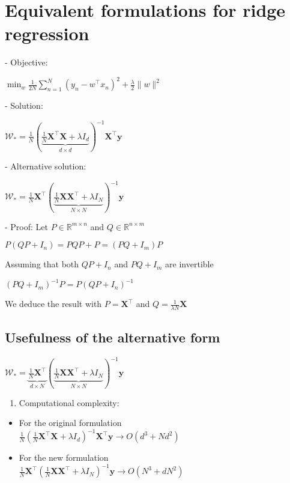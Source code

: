 \section*{Equivalent formulations for ridge regression}
- Objective: 

$
\min _{w} \frac{1}{2 N} \sum_{n=1}^{N}\left(y_{n}-w^{\top} x_{n}\right)^{2}+\frac{\lambda}{2}\|w\|^{2}
$

- Solution:

$
\mathcal{W}_{*}=\frac{1}{N}(\underbrace{\frac{1}{N} \mathbf{X}^{\top} \mathbf{X}+\lambda I_{d}}_{d \times d})^{-1} \mathbf{X}^{\top} \mathbf{y}
$

- Alternative solution:

$
\mathcal{W}_{*}=\frac{1}{N} \mathbf{X}^{\top}(\underbrace{\frac{1}{N} \mathbf{X X}^{\top}+\lambda I_{N}}_{N \times N})^{-1} \mathbf{y}
$

- Proof: Let $P \in \mathbb{R}^{m \times n}$ and $Q \in \mathbb{R}^{n \times m}$

$
P\left(Q P+I_{n}\right)=P Q P+P=\left(P Q+I_{m}\right) P
$

Assuming that both $Q P+I_{n}$ and $P Q+I_{m}$ are invertible

$
\left(P Q+I_{m}\right)^{-1} P=P\left(Q P+I_{n}\right)^{-1}
$

We deduce the result with $P=\mathbf{X}^{\top}$ and $Q=\frac{1}{\lambda N} \mathbf{X}$


\subsection*{Usefulness of the alternative form}
$
\mathcal{W}_{*}=\underbrace{\frac{1}{N} \mathbf{X}^{\top}}_{d \times N}(\underbrace{\frac{1}{N} \mathbf{X X}^{\top}+\lambda I_{N}}_{N \times N})^{-1} \mathbf{y}
$

\begin{enumerate}
  \item Computational complexity:
\end{enumerate}

\begin{itemize}
  \item For the original formulation \\ $\frac{1}{N}\left(\frac{1}{N} \mathbf{X}^{\top} \mathbf{X}+\lambda I_{d}\right)^{-1} \mathbf{X}^{\top} \mathbf{y} \rightarrow O\left(d^{3}+N d^{2}\right)$
  \item For the new formulation \\$\frac{1}{N} \mathbf{X}^{\top}\left(\frac{1}{N} \mathbf{X} \mathbf{X}^{\top}+\lambda I_{N}\right)^{-1} \mathbf{y} \rightarrow O\left(N^{3}+d N^{2}\right)$
\end{itemize}

